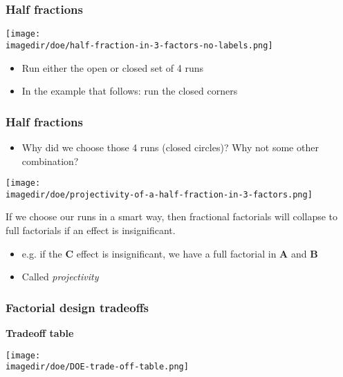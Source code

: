 \begin{frame}\frametitle{Half fractions}
	\begin{center}
		\texttt{[image: \\imagedir/doe/half-fraction-in-3-factors-no-labels.png]}
	\end{center}
	\begin{itemize}
		\item	Run either the open or closed set of 4 runs
		\item	In the example that follows: run the closed corners
	\end{itemize}
\end{frame}

\begin{frame}\frametitle{Half fractions}
	\begin{itemize}
		\item	Why did we choose those 4 runs (closed circles)? Why not some other combination?
	\end{itemize}
	\vspace{-6pt}
	\begin{center}
		\texttt{[image: \\imagedir/doe/projectivity-of-a-half-fraction-in-3-factors.png]}
	\end{center}
	If we choose our runs in a smart way, then fractional factorials will collapse to full factorials if an effect is insignificant.
	\begin{itemize}
		\item	e.g. if the \textbf{C} effect is insignificant, we have a full factorial in \textbf{A} and \textbf{B}
		\item	Called \emph{projectivity}
	\end{itemize}
\end{frame}

\begin{frame}\frametitle{Factorial design tradeoffs}

	{\color{red}\textbf{Tradeoff table}} {}
	\begin{center}
		\texttt{[image: \\imagedir/doe/DOE-trade-off-table.png]}
	\end{center}
\end{frame}

